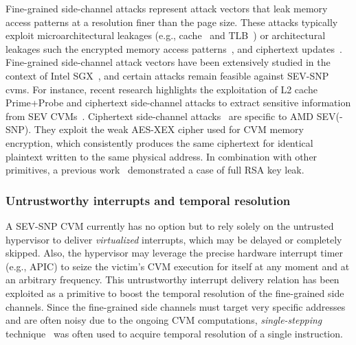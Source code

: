 \label{sec:background:fine-grained-sc}
Fine-grained side-channel attacks represent attack vectors that leak memory access patterns at a resolution finer than the page size.
These attacks typically exploit microarchitectural leakages (e.g., cache~\cite{sgx-cache-attack,cache-attack-sgx,hahnel_high-resolution_2017} and TLB~\cite{wang2017leaky}) or architectural leakages such the encrypted memory access patterns~\cite{leeoffchip}, and ciphertext updates~\cite{li2021cipherleaks,li2022systematic}.
Fine-grained side-channel attack vectors have been extensively studied in the context of Intel SGX~\cite{sgx-cache-attack,cache-attack-sgx,sgx-step,bulck2018nemesis,hahnel_high-resolution_2017,cachezoom,sgxspectre,foreshadow}, and certain attacks remain feasible against SEV-SNP \glspl{cvm}.
For instance, recent research highlights the exploitation of L2 cache Prime+Probe and ciphertext side-channel attacks to extract sensitive information from SEV CVMs~\cite{li2021cipherleaks,li2022systematic,sevstep}.
Ciphertext side-channel attacks~\cite{li2021cipherleaks,li2022systematic,ciphersteal} are specific to AMD SEV(-SNP).
They exploit the weak AES-XEX cipher used for CVM memory encryption, which consistently produces the same ciphertext for identical plaintext written to the same physical address.
In combination with other primitives, a previous work~\cite{li2021cipherleaks} demonstrated a case of full RSA key leak.

\subsubsection{Untrustworthy interrupts and temporal resolution}
\label{sec:background:interrupts}
A SEV-SNP CVM currently has no option but to rely solely on the untrusted hypervisor to deliver \emph{virtualized} interrupts, which may be delayed or completely skipped.
Also, the hypervisor may leverage the precise hardware interrupt timer (e.g., APIC) to seize the victim's CVM execution for itself at any moment and at an arbitrary frequency.
This untrustworthy interrupt delivery relation has been exploited as a primitive to boost the temporal resolution of the fine-grained side channels.
Since the fine-grained side channels must target very specific addresses and are often noisy due to the ongoing CVM computations, \emph{single-stepping} technique~\cite{sevstep,sgx-step,cachewarp} was often used to acquire temporal resolution of a single instruction.

